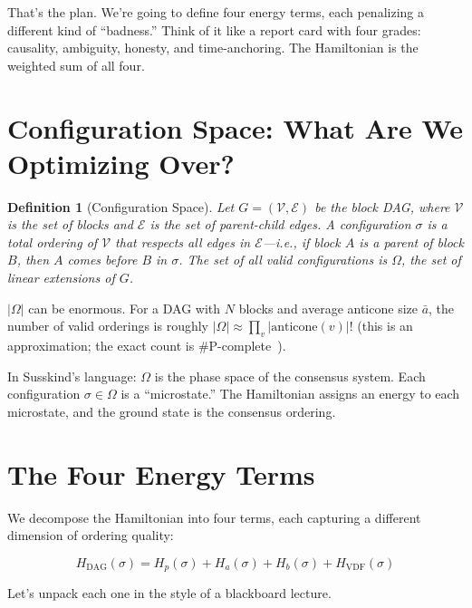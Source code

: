 \documentclass[11pt,a4paper]{article}
\newtheorem{definition}[theorem]{Definition}
\begin{document}
That's the plan. We're going to define four energy terms, each penalizing a different kind of ``badness.'' Think of it like a report card with four grades: causality, ambiguity, honesty, and time-anchoring. The Hamiltonian is the weighted sum of all four.

\section{Configuration Space: What Are We Optimizing Over?}

\begin{definition}[Configuration Space]
Let $G = (\mathcal{V}, \mathcal{E})$ be the block DAG, where $\mathcal{V}$ is the set of blocks and $\mathcal{E}$ is the set of parent-child edges. A \emph{configuration} $\sigma$ is a total ordering of $\mathcal{V}$ that respects all edges in $\mathcal{E}$---i.e., if block $A$ is a parent of block $B$, then $A$ comes before $B$ in $\sigma$. The set of all valid configurations is $\Omega$, the set of \emph{linear extensions} of $G$.
\end{definition}

$|\Omega|$ can be enormous. For a DAG with $N$ blocks and average anticone size $\bar{a}$, the number of valid orderings is roughly $|\Omega| \approx \prod_{v} |\text{anticone}(v)|!$ (this is an approximation; the exact count is \#P-complete~\cite{brightwell}).

In Susskind's language: $\Omega$ is the phase space of the consensus system. Each configuration $\sigma \in \Omega$ is a ``microstate.'' The Hamiltonian assigns an energy to each microstate, and the ground state is the consensus ordering.

\section{The Four Energy Terms}

We decompose the Hamiltonian into four terms, each capturing a different dimension of ordering quality:

\begin{equation}
\boxed{H_{\text{DAG}}(\sigma) = H_p(\sigma) + H_a(\sigma) + H_b(\sigma) + H_{\text{VDF}}(\sigma)}
\label{eq:hamiltonian}
\end{equation}

Let's unpack each one in the style of a blackboard lecture.
\end{document}
